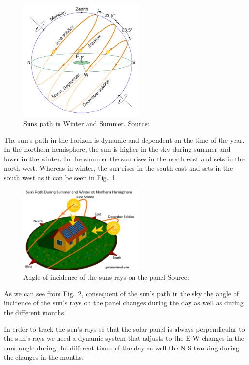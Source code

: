 \documentclass[conference]{IEEEtran}
\begin{document}
\begin{figure}[htbp]
	\includegraphics[width=2.5in]{img/SunsPath1.png}
	\centering
    \captionsetup{justification=centering}
	\caption{Suns path in Winter and Summer. Source: \cite{b1}}
	\label{fig:SunsPath1}
\end{figure}

The sun's path in the horizon is dynamic and dependent on the time of the year. In the northern hemisphere, the sun is higher in the sky during summer and lower in the winter. In the summer the sun rises in the north east and sets in the north west. Whereas in winter, the sun rises in the south east and sets in the south west as it can be seen in Fig.~\ref{fig:SunsPath1}

\begin{figure}[htbp]
    \includegraphics[width=2.5in]{img/SunsPath2.png}
    \centering
    \captionsetup{justification=centering}
    \caption{Angle of incidence of the suns rays on the panel Source: \cite{b2}}
    \label{fig:SunsPath2}
\end{figure}

\par\smallskip
As we can see from Fig.~\ref{fig:SunsPath2}, consequent of the sun's path in the sky the angle of incidence of the sun's rays on the panel changes during the day as well as during the different months.

\par\smallskip
In order to track the sun's rays so that the solar panel is always perpendicular to the sun's rays we need a dynamic system that adjusts to the E-W changes in the suns angle during the different times of the day as well the N-S tracking during the changes in the months.
\end{document}
